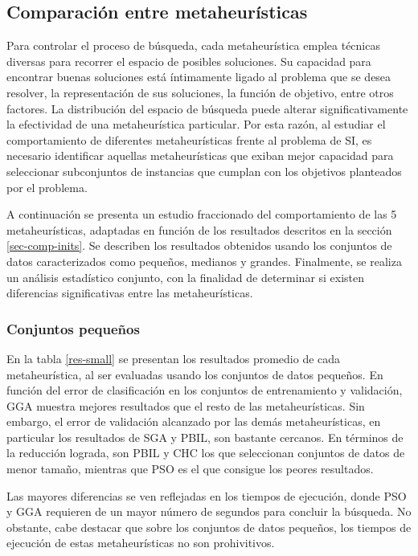 \subsection{Comparación entre metaheurísticas}
\label{sec-comp-meta}

Para controlar el proceso de búsqueda, cada metaheurística emplea técnicas diversas para recorrer el espacio de posibles soluciones. Su capacidad para encontrar buenas soluciones está íntimamente ligado al problema que se desea resolver, la representación de sus soluciones, la función de objetivo, entre otros factores. La distribución del espacio de búsqueda puede alterar significativamente la efectividad de una metaheurística particular. Por esta razón, al estudiar el comportamiento de diferentes metaheurísticas frente al problema de SI, es necesario identificar aquellas metaheurísticas que exiban mejor capacidad para seleccionar subconjuntos de instancias que cumplan con los objetivos planteados por el problema.

A continuación se presenta un estudio fraccionado del comportamiento de las 5 metaheurísticas, adaptadas en función de los resultados descritos en la sección \ref{sec-comp-inits}. Se describen los resultados obtenidos usando los conjuntos de datos caracterizados como pequeños, medianos y grandes. Finalmente, se realiza un análisis estadístico conjunto, con la finalidad de determinar si existen diferencias significativas entre las metaheurísticas.

\subsubsection{Conjuntos pequeños}

En la tabla \ref{res-small} se presentan los resultados promedio de cada metaheurística, al ser evaluadas usando los conjuntos de datos pequeños. En función del error de clasificación en los conjuntos de entrenamiento y validación, GGA muestra mejores resultados que el resto de las metaheurísticas. Sin embargo, el error de validación alcanzado por las demás metaheurísticas, en particular los resultados de SGA y PBIL, son bastante cercanos. En términos de la reducción lograda, son PBIL y CHC los que seleccionan conjuntos de datos de menor tamaño, mientras que PSO es el que consigue los peores resultados.

Las mayores diferencias se ven reflejadas en los tiempos de ejecución, donde PSO y GGA requieren de un mayor número de segundos para concluir la búsqueda. No obstante, cabe destacar que sobre los conjuntos de datos pequeños, los tiempos de ejecución de estas metaheurísticas no son prohivitivos.

